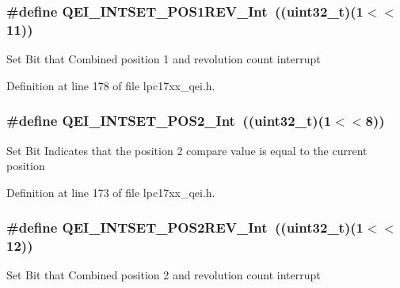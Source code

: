 \hypertarget{group___q_e_i___private___macros_gacf5237bf62eae4a8a06815db8b79cae5}{
\subsubsection[{\-Q\-E\-I\-\_\-\-I\-N\-T\-S\-E\-T\-\_\-\-P\-O\-S1\-R\-E\-V\-\_\-\-Int}]{\setlength{\rightskip}{0pt plus 5cm}\#define {\bf \-Q\-E\-I\-\_\-\-I\-N\-T\-S\-E\-T\-\_\-\-P\-O\-S1\-R\-E\-V\-\_\-\-Int}~((uint32\-\_\-t)(1$<$$<$11))}}\label{group___q_e_i___private___macros_gacf5237bf62eae4a8a06815db8b79cae5}
\-Set \-Bit that \-Combined position 1 and revolution count interrupt 

\-Definition at line 178 of file lpc17xx\-\_\-qei.\-h.

\hypertarget{group___q_e_i___private___macros_ga9e4fd82ab49688c849afc383d999ff37}{
\subsubsection[{\-Q\-E\-I\-\_\-\-I\-N\-T\-S\-E\-T\-\_\-\-P\-O\-S2\-\_\-\-Int}]{\setlength{\rightskip}{0pt plus 5cm}\#define {\bf \-Q\-E\-I\-\_\-\-I\-N\-T\-S\-E\-T\-\_\-\-P\-O\-S2\-\_\-\-Int}~((uint32\-\_\-t)(1$<$$<$8))}}\label{group___q_e_i___private___macros_ga9e4fd82ab49688c849afc383d999ff37}
\-Set \-Bit \-Indicates that the position 2 compare value is equal to the current position 

\-Definition at line 173 of file lpc17xx\-\_\-qei.\-h.

\hypertarget{group___q_e_i___private___macros_gacf556f0674cc2e4f5d2006bfb8c8f442}{
\subsubsection[{\-Q\-E\-I\-\_\-\-I\-N\-T\-S\-E\-T\-\_\-\-P\-O\-S2\-R\-E\-V\-\_\-\-Int}]{\setlength{\rightskip}{0pt plus 5cm}\#define {\bf \-Q\-E\-I\-\_\-\-I\-N\-T\-S\-E\-T\-\_\-\-P\-O\-S2\-R\-E\-V\-\_\-\-Int}~((uint32\-\_\-t)(1$<$$<$12))}}\label{group___q_e_i___private___macros_gacf556f0674cc2e4f5d2006bfb8c8f442}
\-Set \-Bit that \-Combined position 2 and revolution count interrupt 

